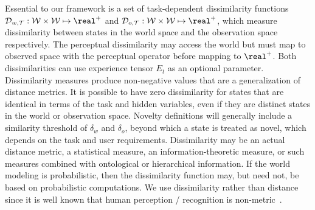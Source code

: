 Essential to our framework is a set of task-dependent dissimilarity functions ${\cal D}_{w,{\cal T}}:{\cal W}\times {\cal W} \mapsto \real^+$ and ${\cal D}_{o,{\cal T}}:{\cal W}\times {\cal W} \mapsto \real^+$, which measure dissimilarity between states in the world space and the observation space respectively.  The perceptual dissimilarity may access the world but must map to observed space with the perceptual operator before mapping to $\real^+$. 
Both dissimilarities can use experience tensor $E_t$ as an optional parameter.
Dissimilarity measures produce non-negative values that are a generalization of distance metrics. It is possible to have zero dissimilarity for states that are identical in terms of the task and hidden variables, even if they are distinct states in the world or observation space. Novelty definitions will generally include a similarity threshold of $\delta_w$ and $\delta_o$, beyond which a state is treated as novel, which depends on the task and user requirements.
Dissimilarity may be an actual distance metric, a statistical measure, an information-theoretic measure, or such measures combined with ontological or hierarchical information.  If the world modeling is probabilistic, then the dissimilarity function may, but need not, be based on probabilistic computations.   
We use dissimilarity rather than distance since it is well known that human perception / recognition is non-metric~\cite{tversky1977features,scheirer2014good}. %







